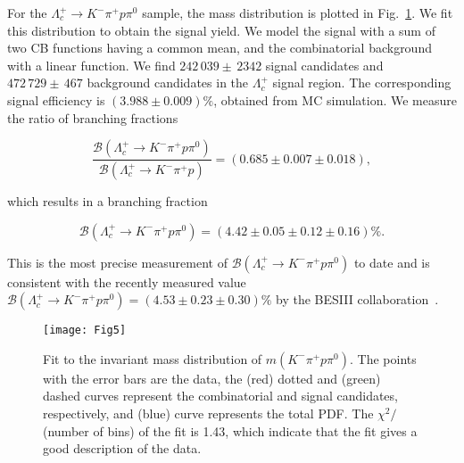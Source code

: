 \documentclass[aps,prl,twocolumn,superscriptaddress,showpacs,preprintnumbers,amsmath,amssymb]{revtex4-1}
\begin{document}
For the $\Lambda_c^+\to K^-\pi^+p\pi^0$ sample, %
the mass distribution is plotted in Fig.~\ref{fig:invmass_control2_data}. We fit this distribution to obtain the signal yield. We model the signal  with a sum of two CB functions having a common mean, and the combinatorial background  with a linear function.
We find $242\,039\pm \,2342$ signal candidates and $472\,729\pm\,467$ background candidates in the $\Lambda_c^+$ signal region.
The corresponding signal efficiency is $(3.988\pm0.009)\%$, obtained from  MC simulation. We measure the ratio of branching fractions
\begin{linenomath}
\begin{equation*}
\frac{\mathcal{B}(\Lambda_c^+\to K^-\pi^+p\pi^0)}{\mathcal{B}(\Lambda_c^+\to K^-\pi^+p)}=(0.685\pm0.007\pm 0.018),
\end{equation*}
\end{linenomath}
which results in a branching fraction
\begin{linenomath}
\begin{equation*}
\mathcal{B}(\Lambda_c^+\to K^-\pi^+p\pi^0)=(4.42\pm0.05\pm 0.12\pm0.16)\%.
\end{equation*}
\end{linenomath}
This is the most precise measurement of $\mathcal{B}(\Lambda_c^+\to K^-\pi^+p\pi^0)$ to date and is consistent with the recently measured value $\mathcal{B}(\Lambda_c^+\to K^-\pi^+p\pi^0)=(4.53\pm0.23\pm0.30)\%$ by the BESIII collaboration~\cite{Ablikim:2015flg}.
\begin{figure}[h!tb]
\centering
\texttt{[image: Fig5]}
\caption{\small  Fit to the invariant mass distribution of $m(K^-\pi^+p\pi^0)$. The points with the error bars are the  data,  the (red) dotted and (green) dashed curves  represent the combinatorial and  signal  candidates, respectively, and (blue) curve represents the total PDF.  The $\chi^2/$ (number of bins) of the fit is 1.43, which indicate that the fit gives a good description of the data.}
\label{fig:invmass_control2_data}
\end{figure}
\end{document}
